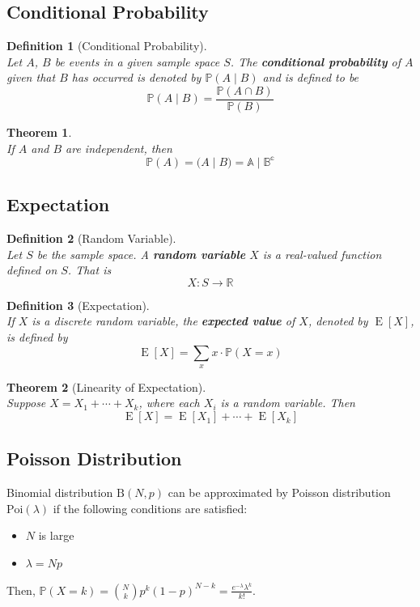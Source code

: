 \documentclass[12pt]{article}
\newtheorem{definition}{Definition}[section]
\newtheorem{theorem}{Theorem}[section]
\theoremstyle{definition}
\DeclareMathOperator{\expec}{E}
\begin{document}
\subsection{Conditional Probability}
\begin{definition}[Conditional Probability] \hfill\\\normalfont Let $A$, $B$ be events in a given sample space $S$. The \textbf{conditional probability} of $A$ given that $B$ has occurred is denoted by $\mathbb{P}(A\mid B)$ and is defined to be
\[
\mathbb{P}(A\mid B)=\frac{\mathbb{P}(A\cap B)}{\mathbb{P}(B)}
\]
\end{definition}
\begin{theorem}\hfill\\\normalfont If $A$ and $B$ are independent, then
\[
\mathbb{P}(A)=\mathbb(A\mid B) = \mathbb{A\mid B^c}
\]
\end{theorem}
\subsection{Expectation}
\begin{definition}[Random Variable]
\hfill\\\normalfont Let $S$ be the sample space. A \textbf{random variable} $X$ is a real-valued function defined on $S$. That is
\[
X:S\to \mathbb{R}
\]
\end{definition}
\begin{definition}[Expectation]
\hfill\\\normalfont If $X$ is a discrete random variable, the \textbf{expected value} of $X$, denoted by $\expec[X]$, is defined by
\[
\expec[X]=\sum_{x}x\cdot \mathbb{P}(X=x)
\] 
\end{definition}
\begin{theorem}[Linearity of Expectation]
\hfill\\\normalfont Suppose $X=X_1+\cdots+X_k$, where each $X_i$ is a random variable. Then
\[
\expec[X]=\expec[X_1]+\cdots+\expec[X_k]
\]
\end{theorem}
\subsection{Poisson Distribution}
Binomial distribution $\text{B}(N,p)$ can be approximated by Poisson distribution $\text{Poi}(\lambda)$ if the following conditions are satisfied:
\begin{itemize}
  \item $N$ is large
  \item $\lambda = Np$
\end{itemize}
Then, $\mathbb{P}(X=k)=\binom{N}{k}p^k(1-p)^{N-k}=\frac{e^{-\lambda}\lambda^k}{k!}$.
\end{document}
